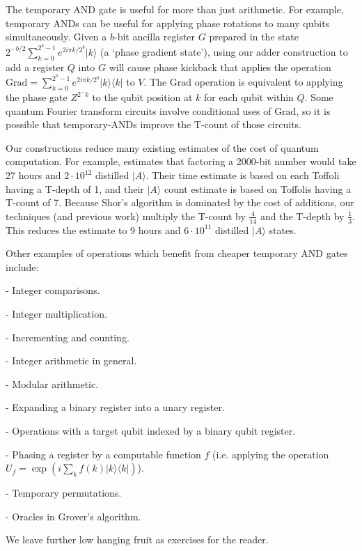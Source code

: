 \documentclass[twocolumn,longbibliography]{quantumarticle-customized}
\begin{document}
The temporary AND gate is useful for more than just arithmetic.
For example, temporary ANDs can be useful for applying phase rotations to many qubits simultaneously.
Given a $b$-bit ancilla register $G$ prepared in the state $2^{-b/2} \sum_{k=0}^{2^b-1} e^{2 i \pi k / 2^b} |k\rangle$ (a `phase gradient state'), using our adder construction to add a register $Q$ into $G$ will cause phase kickback that applies the operation $\text{Grad} = \sum_{k=0}^{2^b-1} e^{2 i \pi k / 2^b} |k\rangle \langle k|$ to $V$.
The $\text{Grad}$ operation is equivalent to applying the phase gate $Z^{2^-k}$ to the qubit position at $k$ for each qubit within $Q$.
Some quantum Fourier transform circuits involve conditional uses of $\text{Grad}$, so it is possible that temporary-ANDs improve the T-count of those circuits.

Our constructions reduce many existing estimates of the cost of quantum computation.
For example, \cite{Fowler2012} estimates that factoring a 2000-bit number would take 27 hours and $2 \cdot 10^{12}$ distilled $|A\rangle$.
Their time estimate is based on each Toffoli having a T-depth of 1, and their $|A\rangle$ count estimate is based on Toffolis having a T-count of 7.
Because Shor's algorithm is dominated by the cost of additions, our techniques (and previous work) multiply the T-count by $\frac{4}{14}$ and the T-depth by $\frac{1}{3}$.
This reduces the estimate to 9 hours and $6 \cdot 10^{11}$ distilled $|A\rangle$ states.

Other examples of operations which benefit from cheaper temporary AND gates include:

- Integer comparisons.

- Integer multiplication.

- Incrementing and counting.

- Integer arithmetic in general.

- Modular arithmetic.

- Expanding a binary register into a unary register.

- Operations with a target qubit indexed by a binary qubit register.

- Phasing a register by a computable function $f$ (i.e. applying the operation $U_f = \exp\left( i \sum_k f(k) |k\rangle \langle k| \right)$).

- Temporary permutations.

- Oracles in Grover's algorithm.

We leave further low hanging fruit as exercises for the reader.
\end{document}
